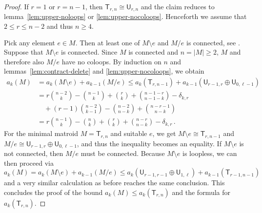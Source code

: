 \documentclass[pagesize,paper=A4,11pt,bibliography=totoc,oneside]{scrartcl}
\newcommand{\abs}[1]{\left|#1\right|}
\newcommand{\UM}[2]{\mathsf{U}_{#2,#1}} %
\newcommand{\MM}[2]{\mathsf{T}_{#2,#1}} %
\begin{document}
\begin{proof}
    If $r=1$ or $r=n-1$, then $\MM{n}{r}\cong\UM{n}{r}$ and the claim reduces to lemma~\ref{lem:upper-noloops} or \ref{lem:upper-nocoloops}. Henceforth we assume that $2\leq r\leq n-2$ and thus $n\geq 4$.

    Pick any element $e\in M$. Then at least one of $M\setminus e$ and $M/e$ is connected, see \cite[\S6.5]{Tutte:ConnectivityMatroids}. Suppose that $M\setminus e$ is connected. Since $M$ is connected and $n=\abs{M}\geq 2$, $M$ and therefore also $M/e$ have no coloops. By induction on $n$ and lemmas~\ref{lem:contract-delete} and \ref{lem:upper-nocoloops}, we obtain
    \begin{align*}
        a_k(M) 
        &= a_k(M\setminus e)+a_{k-1}(M/e)
        \leq a_k(\MM{n-1}{r})+a_{k-1}(\UM{r}{r-1}\oplus \UM{\ell-1}{0}) \\
        &= r\binom{n-2}{k}-\binom{n-1}{k}+\binom{r}{k}+\binom{n-1-r}{n-1-k}-\delta_{k,r} \\
        &\quad+ (r-1)\binom{n-2}{k-1} -\binom{n-2}{n-k}+ \binom{n-r-1}{n-k} \\
        &= r\binom{n-1}{k}-\binom{n}{k}+\binom{r}{k}+\binom{n-r}{n-k}-\delta_{k,r}
        \,.
    \end{align*}
    For the minimal matroid $M=\MM{n}{r}$ and suitable $e$, we get $M\setminus e\cong \MM{n-1}{r}$ and $M/e\cong \UM{r}{r-1}\oplus\UM{\ell-1}{0}$, and thus the inequality becomes an equality. If $M\setminus e$ is not connected, then $M/e$ must be connected. Because $M\setminus e$ is loopless, we can then proceed via
    \begin{equation}\tag{$\ast$}\label{eq:conn-proof-deldisc}
        a_k(M) 
        = a_k(M\setminus e)+a_{k-1}(M/e)
        \leq a_k(\UM{r-1}{r-1}\oplus \UM{\ell}{1})+a_{k-1}(\MM{n-1}{r-1})
    \end{equation}
    and a very similar calculation as before reaches the same conclusion. This concludes the proof of the bound $a_k(M)\leq a_k(\MM{n}{r})$ and the formula for $a_k(\MM{n}{r})$.


\end{proof}
\end{document}
